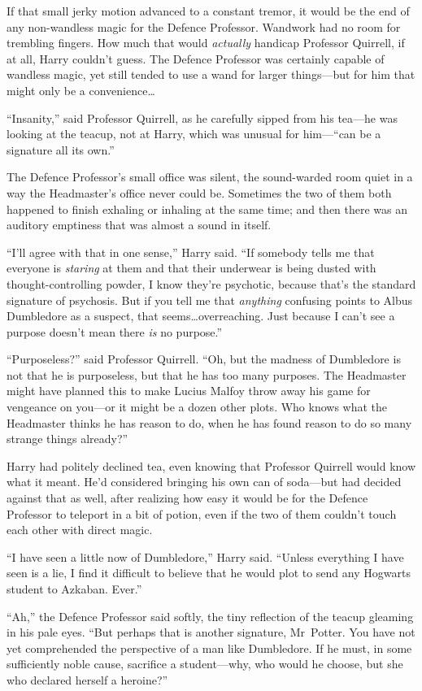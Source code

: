 If that small jerky motion advanced to a constant tremor, it would be the end of any non-wandless magic for the Defence Professor. Wandwork had no room for trembling fingers. How much that would \emph{actually} handicap Professor Quirrell, if at all, Harry couldn’t guess. The Defence Professor was certainly capable of wandless magic, yet still tended to use a wand for larger things—but for him that might only be a convenience…

“Insanity,” said Professor Quirrell, as he carefully sipped from his tea—he was looking at the teacup, not at Harry, which was unusual for him—“can be a signature all its own.”

The Defence Professor’s small office was silent, the sound-warded room quiet in a way the Headmaster’s office never could be. Sometimes the two of them both happened to finish exhaling or inhaling at the same time; and then there was an auditory emptiness that was almost a sound in itself.

“I’ll agree with that in one sense,” Harry said. “If somebody tells me that everyone is \emph{staring} at them and that their underwear is being dusted with thought-controlling powder, I know they’re psychotic, because that’s the standard signature of psychosis. But if you tell me that \emph{anything} confusing points to Albus Dumbledore as a suspect, that seems…overreaching. Just because I can’t see a purpose doesn’t mean there \emph{is} no purpose.”

“Purposeless?” said Professor Quirrell. “Oh, but the madness of Dumbledore is not that he is purposeless, but that he has too many purposes. The Headmaster might have planned this to make Lucius Malfoy throw away his game for vengeance on you—or it might be a dozen other plots. Who knows what the Headmaster thinks he has reason to do, when he has found reason to do so many strange things already?”

Harry had politely declined tea, even knowing that Professor Quirrell would know what it meant. He’d considered bringing his own can of soda—but had decided against that as well, after realizing how easy it would be for the Defence Professor to teleport in a bit of potion, even if the two of them couldn’t touch each other with direct magic.

“I have seen a little now of Dumbledore,” Harry said. “Unless everything I have seen is a lie, I find it difficult to believe that he would plot to send any Hogwarts student to Azkaban. Ever.”

“Ah,” the Defence Professor said softly, the tiny reflection of the teacup gleaming in his pale eyes. “But perhaps that is another signature, Mr~Potter. You have not yet comprehended the perspective of a man like Dumbledore. If he must, in some sufficiently noble cause, sacrifice a student—why, who would he choose, but she who declared herself a heroine?”

